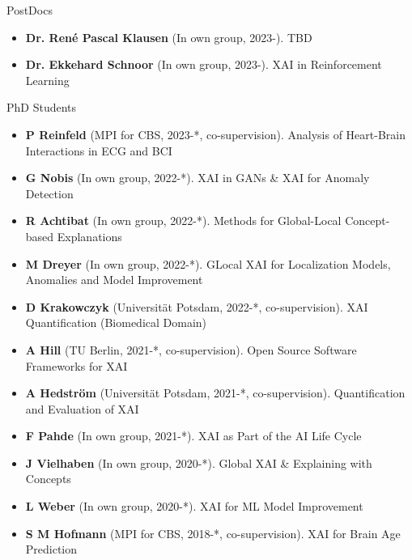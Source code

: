 
\newcommand{\supervision}[3]{\textbf{#1} (In own group, #2). {\small #3}}
\newcommand{\cosupervision}[4]{\textbf{#1} (#2, #3, co-supervision). {\small #4}}

\headedsection 
{PostDocs}
{
    \begin{itemize}
        \item [] \supervision{Dr. Ren\'e Pascal Klausen}{2023-}{TBD}
        \item [] \supervision{Dr. Ekkehard Schnoor}{2023-}{XAI in Reinforcement Learning}
    \end{itemize}
}


\headedsection 
{PhD Students}
{
    \begin{itemize}
        \item [] \cosupervision{P Reinfeld}{MPI for CBS}{2023-*}{Analysis of Heart-Brain Interactions in ECG and BCI}

        \item [] \supervision{G Nobis}{2022-*}{XAI in GANs \& XAI for Anomaly Detection}
        \item [] \supervision{R Achtibat}{2022-*}{Methods for Global-Local Concept-based Explanations}
        \item [] \supervision{M Dreyer}{2022-*}{GLocal XAI for Localization Models, Anomalies and Model Improvement}
        
        \item [] \cosupervision{D Krakowczyk}{Universität Potsdam}{2022-*}{XAI Quantification (Biomedical Domain)}
        \item [] \cosupervision{A Hill}{TU Berlin}{2021-*}{Open Source Software Frameworks for XAI}
        \item [] \cosupervision{A Hedström}{Universität Potsdam}{2021-*}{Quantification and Evaluation of XAI}

        \item [] \supervision{F Pahde}{2021-*}{XAI as Part of the AI Life Cycle}
        \item [] \supervision{J Vielhaben}{2020-*}{Global XAI \& Explaining with Concepts}
        \item [] \supervision{L Weber}{2020-*}{XAI for ML Model Improvement}  
        
        \item [] \cosupervision{S M Hofmann}{MPI for CBS}{2018-*}{XAI for Brain Age Prediction}
        

\end{itemize}}
